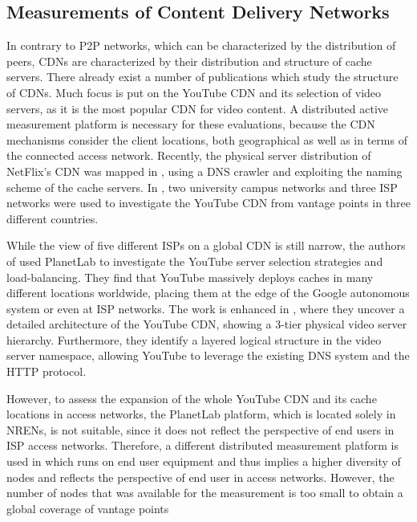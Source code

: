 \subsection{Measurements of Content Delivery Networks}\label{aslevel:measurements:cdn}

In contrary to P2P networks, which can be characterized by the distribution of peers, CDNs are characterized by their distribution and structure of cache servers.
There already exist a number of publications which study the structure of CDNs.
Much focus is put on the YouTube CDN and its selection of video servers, as it is the most popular CDN for video content.
A distributed active measurement platform is necessary for these evaluations, because the CDN mechanisms consider the client locations, both geographical as well as in terms of the connected access network.
Recently, the physical server distribution of NetFlix's CDN was mapped in \cite{bottger2016open}, using a DNS crawler and exploiting the naming scheme of the cache servers.
In \cite{torres2011dissecting}, two university campus networks and three ISP networks were used to investigate the YouTube CDN from vantage points in three different countries.

While the view of five different ISPs on a global CDN is still narrow, the authors of \cite{adhikari2011you} used PlanetLab to investigate the YouTube server selection strategies and load-balancing.
They find that YouTube massively deploys caches in many different locations worldwide, placing them at the edge of the Google autonomous system or even at ISP networks.
The work is enhanced in \cite{adhikari2012vivisecting}, where they uncover a detailed architecture of the YouTube CDN, showing a 3-tier physical video server hierarchy.
Furthermore, they identify a layered logical structure in the video server namespace, allowing YouTube to leverage the existing DNS system and the HTTP protocol.

However, to assess the expansion of the whole YouTube CDN and its cache locations in access networks, the PlanetLab platform, which is located solely in NRENs, is not suitable, since it does not reflect the perspective of end users in ISP access networks.
Therefore, a different distributed measurement platform is used in \cite{rafetseder2011exploring} which runs on end user equipment and thus implies a higher diversity of nodes and reflects the perspective of end user in access networks.
However, the number of nodes that was available for the measurement is too small to obtain a global coverage of vantage points

